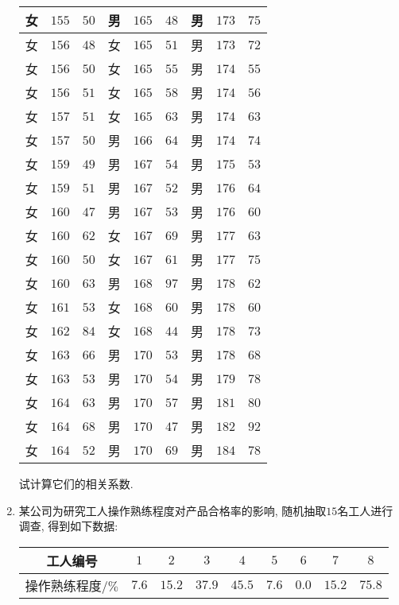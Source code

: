 \documentclass[10pt,a4paper]{article}
\begin{document}
\begin{enumerate}[1.]
\begin{center}
\begin{longtable}{|c|c|c|c|c|c|c|c|c|}
女 & $155$ & $50$ & 男 & $165$ & $48$ & 男 & $173$ & $75$ \\ \hline
女 & $156$ & $48$ & 女 & $165$ & $51$ & 男 & $173$ & $72$ \\ \hline
女 & $156$ & $50$ & 女 & $165$ & $55$ & 男 & $174$ & $55$ \\ \hline
女 & $156$ & $51$ & 女 & $165$ & $58$ & 男 & $174$ & $56$ \\ \hline
女 & $157$ & $51$ & 女 & $165$ & $63$ & 男 & $174$ & $63$ \\ \hline
女 & $157$ & $50$ & 男 & $166$ & $64$ & 男 & $174$ & $74$ \\ \hline
女 & $159$ & $49$ & 男 & $167$ & $54$ & 男 & $175$ & $53$ \\ \hline
女 & $159$ & $51$ & 男 & $167$ & $52$ & 男 & $176$ & $64$ \\ \hline
女 & $160$ & $47$ & 男 & $167$ & $53$ & 男 & $176$ & $60$ \\ \hline
女 & $160$ & $62$ & 女 & $167$ & $69$ & 男 & $177$ & $63$ \\ \hline
女 & $160$ & $50$ & 女 & $167$ & $61$ & 男 & $177$ & $75$ \\ \hline
女 & $160$ & $63$ & 男 & $168$ & $97$ & 男 & $178$ & $62$ \\ \hline
女 & $161$ & $53$ & 女 & $168$ & $60$ & 男 & $178$ & $60$ \\ \hline
女 & $162$ & $84$ & 女 & $168$ & $44$ & 男 & $178$ & $73$ \\ \hline
女 & $163$ & $66$ & 男 & $170$ & $53$ & 男 & $178$ & $68$ \\ \hline
女 & $163$ & $53$ & 男 & $170$ & $54$ & 男 & $179$ & $78$ \\ \hline
女 & $164$ & $63$ & 男 & $170$ & $57$ & 男 & $181$ & $80$ \\ \hline
女 & $164$ & $68$ & 男 & $170$ & $47$ & 男 & $182$ & $92$ \\ \hline
女 & $164$ & $52$ & 男 & $170$ & $69$ & 男 & $184$ & $78$ \\ \hline
\end{longtable}
\end{center}
试计算它们的相关系数.
\item 某公司为研究工人操作熟练程度对产品合格率的影响, 随机抽取$15$名工人进行调查, 得到如下数据:
\begin{center}
\begin{tabular}{|c|c|c|c|c|c|c|c|c|}
\hline
工人编号 & $1$ & $2$ & $3$ & $4$ & $5$ & $6$ & $7$ & $8$ \\ \hline
操作熟练程度/$\%$ & $7.6$ & $15.2$ & $37.9$ & $45.5$ & $7.6$ & $0.0$ & $15.2$ & $75.8$ \\ \hline

\end{tabular}
\end{center}
\end{enumerate}
\end{document}
